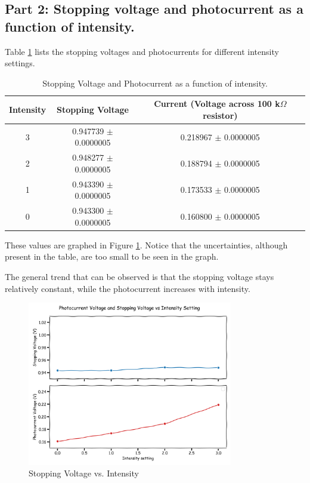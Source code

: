 \subsection{Part 2: Stopping voltage and photocurrent as a function of intensity.}

Table \ref{tab:results2} lists the stopping voltages and photocurrents for different intensity settings.



\begin{table}

    \caption{Stopping Voltage and Photocurrent as a function of intensity.}
    \label{tab:results2}
    \centering
    \begin{tabular}{|c|c|c|}
        \hline
        \rowcolor{lightgray} Intensity & Stopping Voltage         & Current (Voltage across 100 k$\Omega$ resistor) \\
        \hline
        \rowcolor{red!80} 3            & 0.947739 $\pm$ 0.0000005 & 0.218967 $\pm$ 0.0000005                        \\
        \rowcolor{red!60} 2            & 0.948277 $\pm$ 0.0000005 & 0.188794 $\pm$ 0.0000005                        \\
        \rowcolor{red!40} 1            & 0.943390 $\pm$ 0.0000005 & 0.173533 $\pm$ 0.0000005                        \\
        \rowcolor{red!20} 0            & 0.943300 $\pm$ 0.0000005 & 0.160800 $\pm$ 0.0000005                        \\
        \hline
    \end{tabular}
\end{table}

These values are graphed in Figure \ref{fig:voltage_vs_intensity}. Notice that the uncertainties, although present in the table, are too small to be seen in the graph.

The general trend that can be observed is that the stopping voltage stays relatively constant, while the photocurrent increases with intensity.

\begin{figure}[H]
    \centering
    \includegraphics[width=0.8\textwidth]{Results/Part2/Part2.png}
    \caption{Stopping Voltage vs. Intensity}
    \label{fig:voltage_vs_intensity}
\end{figure}


